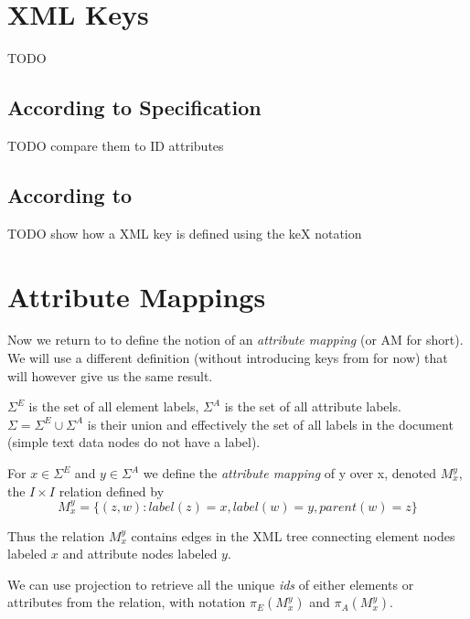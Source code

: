 \section{XML Keys}

TODO

\subsection{According to Specification}

TODO compare them to ID attributes

\subsection{According to \cite{keX}}

TODO show how a XML key is defined using the keX notation %

\section{Attribute Mappings}

Now we return to \cite{fidax} to define the notion of an \textit{attribute mapping} (or AM for short). 
We will use a different definition (without introducing keys from \cite{keX} for now) that will however give us the same result.

\begin{define}
	$\Sigma^E$ is the set of all element labels, $\Sigma^A$ is the set of all attribute labels. $\Sigma = \Sigma^E \cup \Sigma^A$ is their union and effectively the set of all labels in the document (simple text data nodes do not have a label).
\end{define}

\begin{define}
	For $x \in \Sigma^E$ and $y \in \Sigma^A$ we define the \textit{attribute mapping} of y over x, denoted $M_{x}^{y}$, the $I \times I$ %
	relation defined by
	\[M_{x}^{y} = \{ (z,w): label(z) = x, label(w) = y, parent(w) = z \}\]
\end{define}

Thus the relation $M_{x}^{y}$ contains edges in the XML tree connecting element nodes labeled $x$ and attribute nodes labeled $y$.

We can use projection to retrieve all the unique \textit{ids} of either elements or attributes from the relation, with notation $\pi_E(M_{x}^{y})$ and $\pi_A(M_{x}^{y})$.

